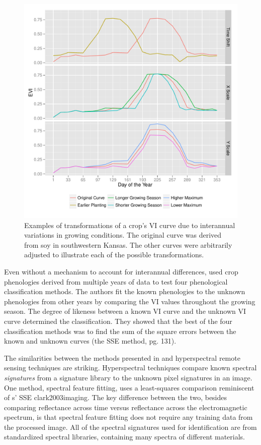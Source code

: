 \begin{figure}
  \centering
  \includegraphics[width=\textwidth]{Graphics/transformations.pdf}
  \caption{Examples of transformations of a crop's VI curve due to interannual variations in growing conditions. The original curve was derived from soy in southwestern Kansas. The other curves were arbitrarily adjusted to illustrate each of the possible transformations.}
  \label{fig:transformations}
\end{figure}

Even without a mechanism to account for interannual differences, \textcite{brown2007multitemporal} used crop phenologies derived from multiple years of data to test four phenological classification methods. The authors fit the known phenologies to the unknown phenologies from other years by comparing the VI values throughout the growing season. The degree of likeness between a known VI curve and the unknown VI curve determined the classification. They showed that the best of the four classification methods was to find the sum of the square errors between the known and unknown curves (the SSE method, pg. 131).

The similarities between the methods presented in \citeauthor{brown2007multitemporal} and hyperspectral remote sensing techniques are striking. Hyperspectral techniques compare known spectral \textit{signatures} from a signature library to the unknown pixel signatures in an image. One method, spectral feature fitting, uses a least-squares comparison reminiscent of \citeauthor{brown2007multitemporal}s’ SSE \autocite{solutions2013selected}{clark2003imaging}. The key difference between the two, besides comparing reflectance across time versus reflectance across the electromagnetic spectrum, is that spectral feature fitting does not require any training data from the processed image. All of the spectral signatures used for identification are from standardized spectral libraries, containing many spectra of different materials.


